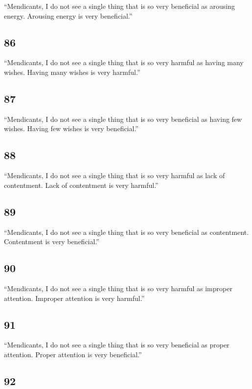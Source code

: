 \documentclass[12pt,openany]{book}%
\begin{document}
“Mendicants, I do not see a single thing that is so very beneficial as arousing energy. Arousing energy is very beneficial.” 

\subsection*{86 }

“Mendicants, I do not see a single thing that is so very harmful as having many wishes. Having many wishes is very harmful.” 

\subsection*{87 }

“Mendicants, I do not see a single thing that is so very beneficial as having few wishes. Having few wishes is very beneficial.” 

\subsection*{88 }

“Mendicants, I do not see a single thing that is so very harmful as lack of contentment. Lack of contentment is very harmful.” 

\subsection*{89 }

“Mendicants, I do not see a single thing that is so very beneficial as contentment. Contentment is very beneficial.” 

\subsection*{90 }

“Mendicants, I do not see a single thing that is so very harmful as improper attention. Improper attention is very harmful.” 

\subsection*{91 }

“Mendicants, I do not see a single thing that is so very beneficial as proper attention. Proper attention is very beneficial.” 

\subsection*{92 }
\end{document}
